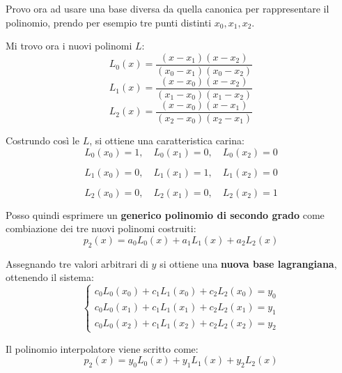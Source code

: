 Provo ora ad usare una base diversa da quella canonica per rappresentare il polinomio,
prendo per esempio tre punti distinti $x_0, x_1, x_2$.

Mi trovo ora i nuovi polinomi $L$:
\begin{equation}
    L_0(x) = \frac{
        (x - x_1)(x - x_2)
    }{
        (x_0 - x_1)(x_0 - x_2)
    }
\end{equation}
\begin{equation}
    L_1(x) = \frac{
        (x - x_0)(x - x_2)
    }{
        (x_1 - x_0)(x_1 - x_2)
    }
\end{equation}
\begin{equation}
    L_2(x) = \frac{
        (x - x_0)(x - x_1)
    }{
        (x_2 - x_0)(x_2 - x_1)
    }
\end{equation}

Costrundo così le $L$, si ottiene una caratteristica carina:
\begin{equation}
    L_0(x_0) = 1, \quad L_0(x_1) = 0, \quad L_0(x_2) = 0
\end{equation}

\begin{equation}
    L_1(x_0) = 0, \quad L_1(x_1) = 1, \quad L_1(x_2) = 0
\end{equation}

\begin{equation}
    L_2(x_0) = 0, \quad L_2(x_1) = 0, \quad L_2(x_2) = 1
\end{equation}


Posso quindi esprimere un \textbf{generico polinomio di secondo grado} come combiazione dei tre
nuovi polinomi costruiti:
\begin{equation}
    p_2(x) = a_0L_0(x) + a_1L_1(x) + a_2L_2(x)
\end{equation}

Assegnando tre valori arbitrari di $y$ si ottiene una \textbf{nuova base lagrangiana}, ottenendo il sistema:
\begin{equation}
    \begin{cases}
        c_0 L_0(x_0) + c_1 L_1(x_0) + c_2 L_2(x_0) = y_0 \\
        c_0 L_0(x_1) + c_1 L_1(x_1) + c_2 L_2(x_1) = y_1 \\
        c_0 L_0(x_2) + c_1 L_1(x_2) + c_2 L_2(x_2) = y_2
    \end{cases}
\end{equation}

Il polinomio interpolatore viene scritto come:
\begin{equation}
    p_2(x) = y_0 L_0(x) + y_1 L_1(x) + y_2 L_2(x)
\end{equation}

